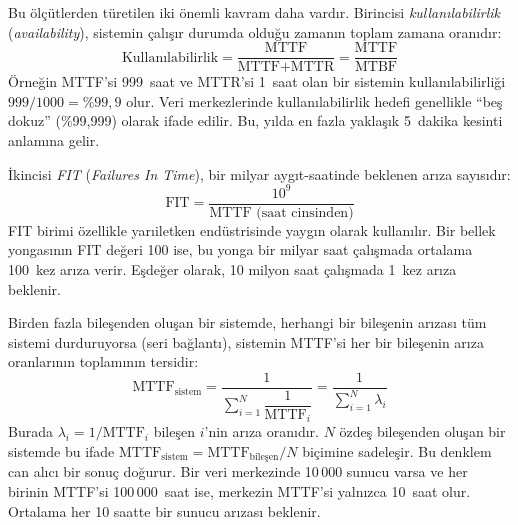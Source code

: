 Bu ölçütlerden türetilen iki önemli kavram daha vardır. Birincisi \emph{kullanılabilirlik} (\emph{availability}), sistemin çalışır durumda olduğu zamanın toplam zamana oranıdır:
%
\begin{equation}
\text{Kullanılabilirlik} = \frac{\text{MTTF}}{\text{MTTF} + \text{MTTR}} = \frac{\text{MTTF}}{\text{MTBF}}
\label{eq:kullanilabilirlik}
\end{equation}
%
Örneğin MTTF'si 999~saat ve MTTR'si 1~saat olan bir sistemin kullanılabilirliği $999/1000 = \%99{,}9$ olur. Veri merkezlerinde kullanılabilirlik hedefi genellikle ``beş dokuz'' (\%99,999) olarak ifade edilir. Bu, yılda en fazla yaklaşık 5~dakika kesinti anlamına gelir.

İkincisi \emph{FIT} (\emph{Failures In Time}), bir milyar aygıt-saatinde beklenen arıza sayısıdır:
%
\begin{equation}
\text{FIT} = \frac{10^9}{\text{MTTF (saat cinsinden)}}
\label{eq:fit}
\end{equation}
%
FIT birimi özellikle yarıiletken endüstrisinde yaygın olarak kullanılır. Bir bellek yongasının FIT değeri 100 ise, bu yonga bir milyar saat çalışmada ortalama 100~kez arıza verir. Eşdeğer olarak, 10 milyon saat çalışmada 1~kez arıza beklenir.

Birden fazla bileşenden oluşan bir sistemde, herhangi bir bileşenin arızası tüm sistemi durduruyorsa (seri bağlantı), sistemin MTTF'si her bir bileşenin arıza oranlarının toplamının tersidir:
%
\begin{equation}
\text{MTTF}_{\text{sistem}} = \frac{1}{\displaystyle\sum_{i=1}^{N} \dfrac{1}{\text{MTTF}_i}} = \frac{1}{\displaystyle\sum_{i=1}^{N} \lambda_i}
\label{eq:mttf-sistem}
\end{equation}
%
Burada $\lambda_i = 1/\text{MTTF}_i$ bileşen $i$'nin arıza oranıdır. $N$ özdeş bileşenden oluşan bir sistemde bu ifade $\text{MTTF}_{\text{sistem}} = \text{MTTF}_{\text{bileşen}} / N$ biçimine sadeleşir. Bu denklem can alıcı bir sonuç doğurur. Bir veri merkezinde 10\,000 sunucu varsa ve her birinin MTTF'si 100\,000~saat ise, merkezin MTTF'si yalnızca 10~saat olur. Ortalama her 10 saatte bir sunucu arızası beklenir.

